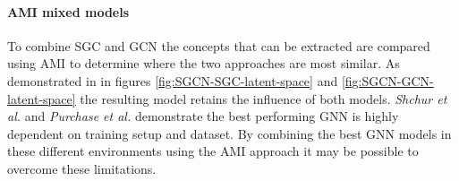 \paragraph{AMI mixed models}
To combine SGC and GCN the concepts that can be extracted are compared using AMI to determine where the two approaches are most similar.
As demonstrated in  in figures \ref{fig:SGCN-SGC-latent-space} and \ref{fig:SGCN-GCN-latent-space} the resulting model retains the influence of both models.
\textit{Shchur et al.}\cite{shchur2018pitfalls} and \textit{Purchase et al.}\cite{purchase2022revisiting} demonstrate the best performing GNN is highly dependent on training setup and dataset.
By combining the best GNN models in these different environments using the AMI approach it may be possible to overcome these limitations.
